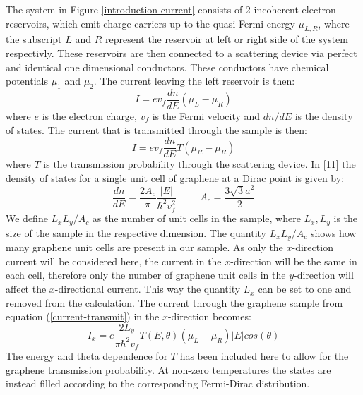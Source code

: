\documentclass[prl,twocolumn,aps,superscriptaddress,floatfix,10pt]{revtex4}
\begin{document}
			 The system in Figure \ref{introduction-current} consists of 2 incoherent electron reservoirs, which emit charge carriers up to the quasi-Fermi-energy $\mu_{L,R}$, where the subscript $L$ and $R$ represent the reservoir at left or right side of the system respectivly. These reservoirs are then connected to a scattering device via perfect and identical one dimensional conductors. These conductors have chemical potentials $\mu_{1}$ and $\mu_{2}$. The current leaving the left reservoir is then:
			\begin{equation}
				I=ev_{f}\frac{dn}{dE}\left(\mu_{L}-\mu_{R}\right)
				\label{current-dos}
			\end{equation}
			where $e$ is the electron charge, $v_{f}$ is the Fermi velocity and $dn/dE$ is the density of states. The current that is transmitted through the sample is then:
			\begin{equation}
				I=ev_{f}\frac{dn}{dE}T\left(\mu_{R}-\mu_{R}\right)
				\label{current-transmit}
			\end{equation}
			where $T$ is the transmission probability through the scattering device. In [11] the density of states for a single unit cell of graphene at a Dirac point is given by:
			\begin{equation}
				\frac{dn}{dE}=\frac{2A_{c}}{\pi}\frac{|E|}{\hbar^{2}v_{f}^{2}}
				\hspace{1cm}
				A_{c}=\frac{3\sqrt{3}a^{2}}{2}
			\end{equation}
			We define $L_{x}L_{y}/A_{c}$ as the number of unit cells in the sample, where  $L_{x}, L_{y}$ is the size of the sample in the respective dimension. The quantity $L_{x}L_{y}/A_{c}$ shows how many graphene unit cells are present in our sample. As only the $x$-direction current will be considered here, the current in the $x$-direction will be the same in each cell, therefore only the number of graphene unit cells in the $y$-direction will affect the $x$-directional current. This way the quantity $L_{x}$ can be set to one and removed from the calculation. The current through the graphene sample from equation (\ref{current-transmit}) in the $x$-direction becomes:
			\begin{equation}
				I_{x}=e\frac{2L_{y}}{\pi \hbar^{2}v_{f}}T\left(E,\theta\right)\left(\mu_{L}-\mu_{R}\right)|E|cos\left(\theta\right)
			\end{equation}
			The energy and theta dependence for $T$ has been included here to allow for the graphene transmission probability. At non-zero temperatures the states are instead filled according to the corresponding Fermi-Dirac distribution.
\end{document}
